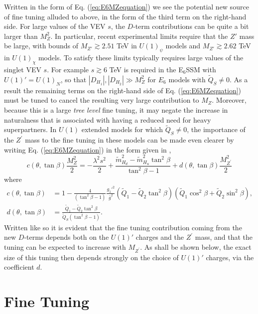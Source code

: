 \documentclass[preprint,amsmath,amssymb,aps,superscriptaddress,prd,showpacs,floatfix]{revtex4-1}
\begin{document}
Written in the form of Eq. (\ref{eq:E6MZequation}) we see the potential new source of fine tuning alluded to above, in the form of the third term on the right-hand side. For large values of the VEV $s$, the $D$-term contributions can be quite a bit larger than $M_Z^2$. In particular, recent experimental limits \cite{Aad:2014cka} require that the $Z'$ mass be large, with bounds of $M_{Z'}\gtrsim 2.51$ TeV in $U(1)_\psi$ models and $M_{Z'}\gtrsim 2.62$ TeV in $U(1)_\chi$ models. To satisfy these limits typically requires large values of the singlet VEV $s$. For example $s\gtrsim 6$ TeV is required in the E$_6$SSM with $U(1)'=U(1)_N$, so that $|D_{H_1}|,|D_{H_2}|\gg M_Z^2$ for $E_6$ models with $\tilde{Q}_S\neq 0$. As a result the remaining terms on the right-hand side of Eq. (\ref{eq:E6MZequation}) must be tuned to cancel the resulting very large contribution to $M_Z$. Moreover, because this is a large \textit{tree level} fine tuning, it may negate the increase in naturalness that is associated with having a reduced need for heavy superpartners. In $U(1)$ extended models for which $\tilde{Q}_S\neq 0$, the importance of the $Z^\prime$ mass to the fine tuning in these models can be made even clearer by writing Eq. (\ref{eq:E6MZequation}) in the form given in \cite{Athron:2013ipa},
\begin{equation}\label{eq:originalE6MZequation}
c(\theta,\tan\beta)\frac{M_Z^2}{2}=-\frac{\lambda^2 s^2}{2}+\frac{\tilde{m}_{H_d}^2-\tilde{m}_{H_u}^2\tan^2\beta}{\tan^2\beta-1}+d(\theta,\tan\beta)\frac{M_{Z^\prime}^2}{2}
\end{equation}
where 
\begin{align}
c(\theta,\tan\beta)&=1-\frac{4}{\left ( \tan^2\beta-1\right )}\frac{g_1'^2}{\bar{g}^2}\left ( \tilde{Q}_1-\tilde{Q}_2\tan^2\beta \right )\left ( \tilde{Q}_1\cos^2\beta+\tilde{Q}_2\sin^2\beta \right ),\label{eq:cdefn}\\
d(\theta,\tan\beta)&= \frac{\tilde{Q}_1-\tilde{Q}_2\tan^2\beta}{\tilde{Q}_S\left ( \tan^2\beta - 1\right )}.\label{eq:ddefn}
\end{align}
Written like so it is evident that the fine tuning contribution coming from the new $D$-terms depends both on the $U(1)'$ charges and the $Z^\prime$ mass, and that the tuning can be expected to increase with $M_{Z^\prime}$. As shall be shown below, the exact size of this tuning then depends strongly on the choice of $U(1)'$ charges, via the coefficient $d$. 
\section{\label{sec:tuning}Fine Tuning}
\end{document}
